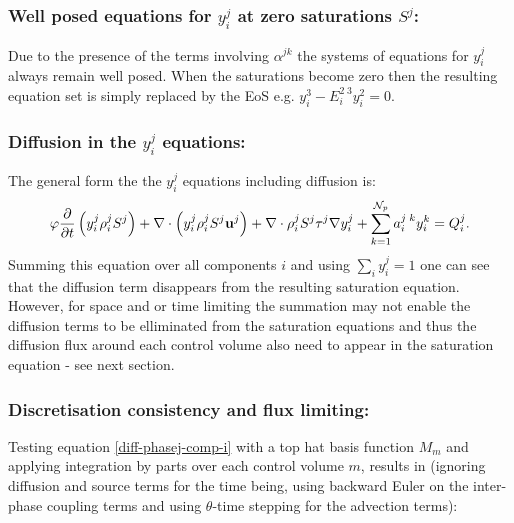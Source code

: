 \subsubsection{Well posed equations for $y_i^j$ at zero saturations $S^j$:} 
Due to the presence of the terms involving $\alpha^{jk}$ the systems of 
equations for $y_i^j$ always remain well posed. When the saturations 
become zero then the resulting equation set is simply replaced by the 
EoS e.g. $y_i^3 - E_i^{2\;3} y_i^2 = 0$.

\subsubsection{Diffusion in the $y_i^j$ equations:} 
The general form the the $y_i^j$ equations including diffusion is: 
\begin{eqnarray}
\phi  \displaystyle\frac{\partial}{\partial t}\left(y_{i}^{j}\rho_i^{j}S^{j} \right) + 
\nabla\cdot\left(y_{i}^{j}\rho_i^{j}S^{j}\mathbf{u}^{j}  \right) 
+ \nabla \cdot \rho_i^{j}S^{j} \tau^j \nabla y_i^j 
+ \sum_{k=1}^{{\cal N}_p} a_i^{j\;k} y_i^k   = Q_i^j. 
\label{diff-phasej-comp-i}
\end{eqnarray}
Summing this equation over all components $i$ and using $\sum_i y_i^j=1$ one 
can see that the diffusion term disappears from the 
resulting saturation equation. However, for space and or time 
limiting the summation may not enable the diffusion terms to 
be elliminated from the saturation equations 
and thus the diffusion 
flux around each control volume also need to appear in the 
saturation equation - see next section. 

\subsubsection{Discretisation consistency and flux limiting:} 

Testing equation \ref{diff-phasej-comp-i} with a top hat basis 
function $M_m$ and applying integration by parts over each control volume $m$,  
results in (ignoring diffusion and source terms for the time being, using backward Euler on the inter-phase coupling terms and using $\theta$-time stepping for the advection terms):
 

